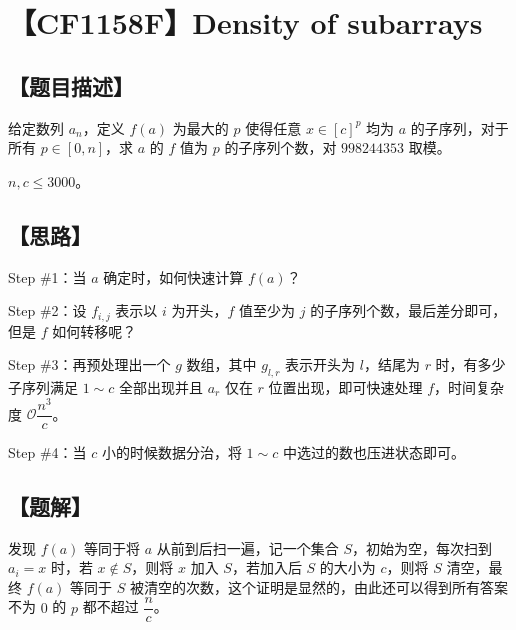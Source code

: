 \documentclass[UTF8,12pt,a4paper]{ctexart} %
\begin{document}
	\fontsize{12pt}{12pt}\selectfont
	
	\newpage
	\pagestyle{fancy}
	
	\section*{【CF1158F】Density of subarrays}
	
	\subsection*{【题目描述】}
	
	给定数列 $a_n$，定义 $f(a)$ 为最大的 $p$ 使得任意 $x\in[c]^{p}$ 均为 $a$ 的子序列，对于所有 $p\in[0,n]$，求 $a$ 的 $f$ 值为 $p$ 的子序列个数，对 $998244353$ 取模。
	
	$n,c\le3000$。
	
	\subsection*{【思路】}
	
	Step \#1：当 $a$ 确定时，如何快速计算 $f(a)$？
	
	Step \#2：设 $f_{i,j}$ 表示以 $i$ 为开头，$f$ 值至少为 $j$ 的子序列个数，最后差分即可，但是 $f$ 如何转移呢？
	
	Step \#3：再预处理出一个 $g$ 数组，其中 $g_{l,r}$ 表示开头为 $l$，结尾为 $r$ 时，有多少子序列满足 $1\sim c$ 全部出现并且 $a_r$ 仅在 $r$ 位置出现，即可快速处理 $f$，时间复杂度 $\mathcal{O}\dfrac{n^3}{c}$。
	
	Step \#4：当 $c$ 小的时候数据分治，将 $1\sim c$ 中选过的数也压进状态即可。
	
	\subsection*{【题解】}
	
	发现 $f(a)$ 等同于将 $a$ 从前到后扫一遍，记一个集合 $S$，初始为空，每次扫到 $a_i=x$ 时，若 $x\not\in S$，则将 $x$ 加入 $S$，若加入后 $S$ 的大小为 $c$，则将 $S$ 清空，最终 $f(a)$ 等同于 $S$ 被清空的次数，这个证明是显然的，由此还可以得到所有答案不为 $0$ 的 $p$ 都不超过 $\dfrac{n}{c}$。
	
\end{document}
